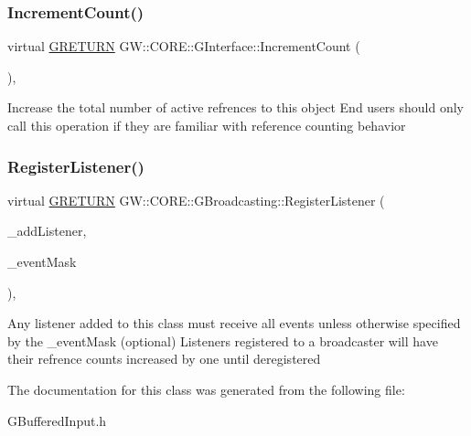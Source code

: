 \subsubsection{\texorpdfstring{Increment\+Count()}{IncrementCount()}}
{\footnotesize\ttfamily virtual \hyperlink{namespace_g_w_a69b1aaebac1cac8049825f035884c95b}{G\+R\+E\+T\+U\+RN} G\+W\+::\+C\+O\+R\+E\+::\+G\+Interface\+::\+Increment\+Count (\begin{DoxyParamCaption}{ }\end{DoxyParamCaption})\hspace{0.3cm}{\ttfamily [pure virtual]}, {\ttfamily [inherited]}}

Increase the total number of active refrences to this object End users should only call this operation if they are familiar with reference counting behavior \hypertarget{class_g_w_1_1_c_o_r_e_1_1_g_broadcasting_a7411c69b20257c02791bccc92cb0fd2b}{}\label{class_g_w_1_1_c_o_r_e_1_1_g_broadcasting_a7411c69b20257c02791bccc92cb0fd2b} 
\subsubsection{\texorpdfstring{Register\+Listener()}{RegisterListener()}}
{\footnotesize\ttfamily virtual \hyperlink{namespace_g_w_a69b1aaebac1cac8049825f035884c95b}{G\+R\+E\+T\+U\+RN} G\+W\+::\+C\+O\+R\+E\+::\+G\+Broadcasting\+::\+Register\+Listener (\begin{DoxyParamCaption}\item[{\hyperlink{class_g_w_1_1_c_o_r_e_1_1_g_listener}{G\+Listener} $\ast$}]{\+\_\+add\+Listener,  }\item[{unsigned long long}]{\+\_\+event\+Mask }\end{DoxyParamCaption})\hspace{0.3cm}{\ttfamily [pure virtual]}, {\ttfamily [inherited]}}

Any listener added to this class must receive all events unless otherwise specified by the \+\_\+event\+Mask (optional) Listeners registered to a broadcaster will have their refrence counts increased by one until deregistered 

The documentation for this class was generated from the following file\+:\begin{DoxyCompactItemize}
\item 
G\+Buffered\+Input.\+h\end{DoxyCompactItemize}
